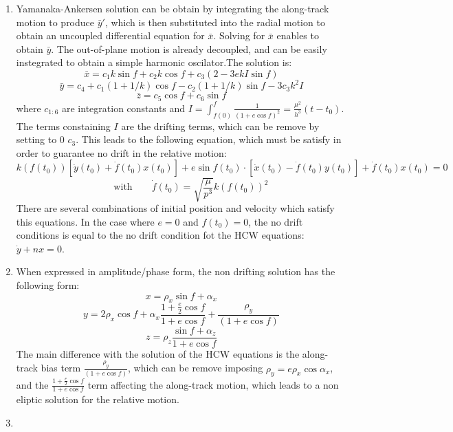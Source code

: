 \documentclass[a4paper]{article}
\begin{document}
\begin{enumerate}[label=\emph{\alph*)}]
  \item  %
      Yamanaka-Ankersen solution can be obtain by integrating the along-track motion to produce $\bar{y}'$, which is then substituted into the radial motion to obtain an uncoupled differential equation for $\bar{x}$. Solving for $\bar{x}$ enables to obtain  $\bar{y}$. The out-of-plane motion is already decoupled, and can be easily instegrated to obtain a simple harmonic oscilator.The solution is:
   \[\bar{x} = c_1 k \sin{f}+c_2 k \cos{f} + c_3 (2 - 3 e k I\sin{f})\]
   \[\bar{y} = c_4 + c_1 (1+1/k)\cos{f} - c_2 (1+1/k) \sin{f} - 3 c_3 k^2 I \]
   \[\bar{z} = c_5 \cos{f} + c_6 \sin{f}\]
   where $c_{1:6}$ are integration constants and $I = \int_{f(0)}^{f}{\frac{1}{(1+e\cos{f})^2}} = \frac{\mu^2}{h^3}(t-t_0)$. The terms constaining $I$ are the drifting terms, which can be remove by setting to 0 $c_3$. This leads to the following equation, which must be satisfy in order to guarantee no drift in the relative motion:
   \[k(f(t_0)) [\dot{y}(t_0)+\dot{f}(t_0)x(t_0)] + e \sin{f(t_0)}\cdot [\dot{x}(t_0) - \dot{f}(t_0)y(t_0)] + \dot{f}(t_0)x(t_0) = 0 \]
   \[ \qquad  \mathrm{with} \qquad \dot{f}(t_0) = \sqrt{\frac{\mu}{p^3}}k(f(t_0))^2  \]
   There are several combinations of initial position and velocity which satisfy this equations. In the case where $e=0$ and $f(t_0)=0$, the no drift conditions is equal to the no drift condition fot the HCW equations: $\dot{y}+nx=0$.
  
  \item %
   When expressed in amplitude/phase form, the non drifting solution has the following form:
   \[x = \rho_x \sin{f+\alpha_x} \]
   \[y = 2 \rho_x \cos{f+\alpha_x} \frac{1+\frac{e}{2}\cos{f}}{1+e\cos{f}} + \frac{\rho_y}{(1+e\cos{f})} \]
   \[z = \rho_z \frac{\sin{f+\alpha_z}}{1+e\cos{f}} \]
   The main difference with the solution of the HCW equations is the along-track bias term  $\frac{\rho_y}{(1+e\cos{f})}$, which can be remove imposing $\rho_y=e\rho_x\cos{\alpha_x}$,  and the $\frac{1+\frac{e}{2}\cos{f}}{1+e\cos{f}}$ term affecting the along-track motion, which leads to a non eliptic solution for the relative motion.
 
  \item %
  
\end{enumerate}
\end{document}

